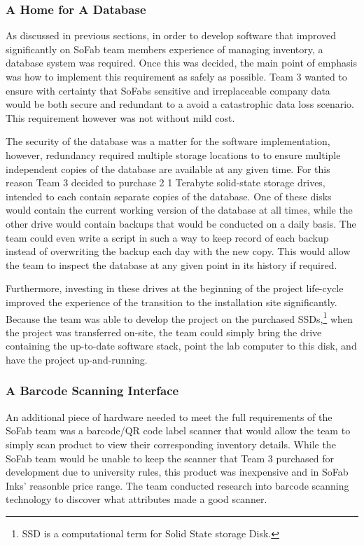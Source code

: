 \documentclass{article}
\begin{document}
\subsubsection{A Home for A Database}
As discussed in previous sections, in order to develop software that improved significantly on SoFab team members experience of managing
inventory, a database system was required. Once this was decided, the main point of emphasis was how to implement this requirement as 
safely as possible. Team 3 wanted to ensure with certainty that SoFabs sensitive and irreplaceable company data would be both secure 
and redundant to a avoid a catastrophic data loss scenario. This requirement however was not without mild cost. 

The security of the database was a matter for the software implementation, however, redundancy required multiple storage locations to 
to ensure multiple independent copies of the database are available at any given time. For this reason Team 3 decided to purchase 2 
1 Terabyte solid-state storage drives, intended to each contain separate copies of the database. One of these disks would contain the 
current working version of the database at all times, while the other drive would contain backups that would be conducted on a daily 
basis. The team could even write a script in such a way to keep record of each backup instead of overwriting the backup each day with the 
new copy. This would allow the team to inspect the database at any given point in its history if required. 

Furthermore, investing in these drives at the beginning of the project life-cycle improved the experience of the transition to the 
installation site significantly. Because the team was able to develop the project on the purchased SSDs,\footnote{SSD is a computational
term for Solid State storage Disk.} when the project was transferred on-site, the team could simply bring the drive containing the up-to-date
software stack, point the lab computer to this disk, and have the project up-and-running. 
\subsubsection{A Barcode Scanning Interface} 
An additional piece of hardware needed to meet the full requirements of the SoFab team was a barcode\slash QR code label scanner that 
would allow the team to simply scan product to view their corresponding inventory details. While the SoFab team would be unable to keep 
the scanner that Team 3 purchased for development due to university rules, this product was inexpensive and in SoFab Inks' reasonble price
range. The team conducted research into barcode scanning technology to discover what attributes made a good scanner. 
\end{document}
